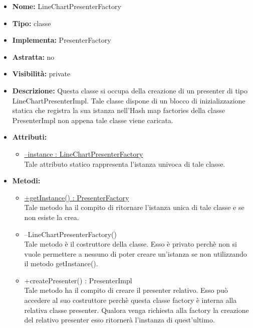 			
			\begin{itemize}
			\item \textbf{Nome:} LineChartPresenterFactory
			\item \textbf{Tipo:} classe
			
		\item \textbf{Implementa:}
		PresenterFactory
		\item \textbf{Astratta:}
		no
			\item \textbf{Visibilità:} private
			\item \textbf{Descrizione:} Questa classe si occupa della creazione di un presenter di tipo LineChartPresenterImpl. Tale classe dispone di un blocco di inizializzazione statica che registra la sua istanza nell'Hash map factories della classe PresenterImpl non appena tale classe viene caricata.
			\item \textbf{Attributi:}
				\begin{itemize}
				\setlength{\itemsep}{5pt}
				
					\item[\ding{111}] \underline{--instance : LineChartPresenterFactory} \\ [1mm] Tale attributo statico rappresenta l'istanza univoca di tale classe.
				\end{itemize}
		
			\item \textbf{Metodi:}
				\begin{itemize}
				\setlength{\itemsep}{5pt}
				
					\item[\ding{111}] {\underline{+getInstance() : PresenterFactory}} \\ [1mm] Tale metodo ha il compito di ritornare l'istanza unica di tale classe e se non esiste la crea.
					\item[\ding{111}] {{--LineChartPresenterFactory()}} \\ [1mm] Tale metodo è il costruttore della classe. Esso è privato perchè non si vuole permettere a nessuno di poter creare un'istanza se non utilizzando il metodo getInstance().
					\item[\ding{111}] {{+createPresenter() : PresenterImpl}} \\ [1mm] Tale metodo ha il compito di creare il presenter relativo. Esso può accedere al suo costruttore perchè questa classe factory è interna alla relativa classe presenter. Qualora venga richiesta alla factory la creazione del relativo presenter esso ritornerà l'instanza di quest'ultimo.
				\end{itemize}
		
			\end{itemize}

